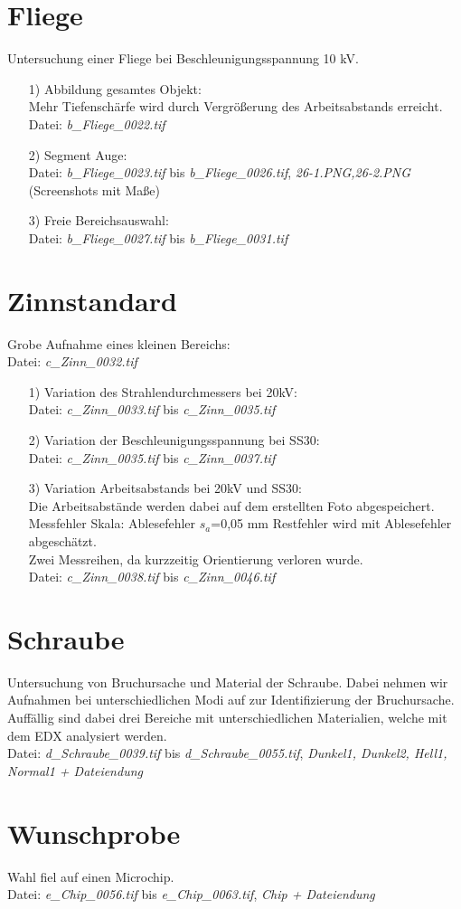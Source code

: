 \section*{Fliege}
Untersuchung einer Fliege bei Beschleunigungsspannung 10 kV.
\begin{itemize}
   \item[1)] Abbildung gesamtes Objekt:\\
   Mehr Tiefenschärfe wird durch Vergrößerung des Arbeitsabstands erreicht. 
   Datei: \textit{b\_Fliege\_0022.tif}
   \item[2)] Segment Auge:\\
   Datei: \textit{b\_Fliege\_0023.tif} bis \textit{b\_Fliege\_0026.tif}, \textit{26-1.PNG,26-2.PNG} (Screenshots mit Maße)
   \item[3)] Freie Bereichsauswahl:\\
   Datei: \textit{b\_Fliege\_0027.tif} bis \textit{b\_Fliege\_0031.tif}
\end{itemize}

\section*{Zinnstandard}
Grobe Aufnahme eines kleinen Bereichs:\\
Datei: \textit{c\_Zinn\_0032.tif}
\begin{itemize}
   \item[1)] Variation des Strahlendurchmessers bei 20kV:\\ 
   Datei: \textit{c\_Zinn\_0033.tif} bis \textit{c\_Zinn\_0035.tif} 
   \item[2)] Variation der Beschleunigungsspannung bei SS30:\\
   Datei: \textit{c\_Zinn\_0035.tif} bis \textit{c\_Zinn\_0037.tif}  
   \item[3)] Variation Arbeitsabstands bei 20kV und SS30:\\
   Die Arbeitsabstände werden dabei auf dem erstellten Foto abgespeichert.\\
   Messfehler Skala: Ablesefehler $s_a$=0,05 mm Restfehler wird mit Ablesefehler abgeschätzt.\\ 
   Zwei Messreihen, da kurzzeitig Orientierung verloren wurde.\\
   Datei: \textit{c\_Zinn\_0038.tif} bis \textit{c\_Zinn\_0046.tif}      
\end{itemize}

\section*{Schraube}
Untersuchung von Bruchursache und Material der Schraube. Dabei nehmen wir Aufnahmen bei unterschiedlichen Modi auf zur Identifizierung der Bruchursache. Auffällig sind dabei drei Bereiche mit unterschiedlichen Materialien, welche mit dem EDX analysiert werden.\\
Datei: \textit{d\_Schraube\_0039.tif} bis \textit{d\_Schraube\_0055.tif}, \textit{Dunkel1, Dunkel2, Hell1, Normal1 + Dateiendung}

\section*{Wunschprobe}
Wahl fiel auf einen Microchip.\\
Datei: \textit{e\_Chip\_0056.tif} bis \textit{e\_Chip\_0063.tif}, \textit{Chip + Dateiendung}
